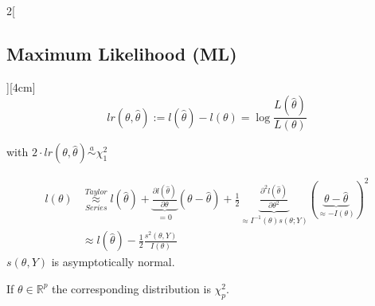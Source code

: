 \documentclass[8pt]{extarticle}
\begin{document}
\begin{multicols}{2}[\subsection{Maximum Likelihood (ML)}][4cm]
$$lr(\theta,\hat{\theta}) := l(\hat{\theta}) - l(\theta) = \log \frac{L(\hat{\theta})}{L(\theta)}$$

with $2\cdot lr(\theta,\hat{\theta}) \overset{a}{\sim} \chi^2_1$

\begin{Proof}
\vspace{-1.5em}
\begin{align*}
l(\theta) & \overset{Taylor}{\underset{Series}{\approx}} l(\hat{\theta}) + \underbrace{\frac{\partial l(\hat{\theta})}{\partial \theta}}_{=0} (\theta - \hat{\theta}) + \frac{1}{2}\underbrace{\frac{\partial^2 l(\hat{\theta})}{\partial \theta^2}}_{\approx I^{-1}(\theta)s(\theta;Y)}(\underbrace{\theta - \hat{\theta}}_{\approx -I(\theta)})^2\\
&\approx l(\hat{\theta}) - \frac{1}{2} \frac{s^2(\theta, Y)}{I(\theta)}
\end{align*}
$s(\theta,Y)$ is asymptotically normal.
\end{Proof}

If $\theta \in \mathbb{R}^p$ the corresponding distribution is $\chi^2_p$.
  

\end{multicols}
\end{document}
